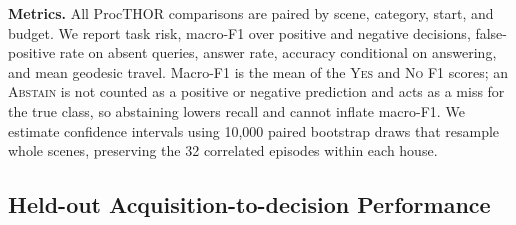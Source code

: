\documentclass[letterpaper, 10 pt, conference]{ieeeconf}
\newcommand{\method}{SafeVantage}
\begin{document}
  
    \textbf{Metrics.}
    All ProcTHOR comparisons are paired by scene, category, start, and budget. We report task risk, macro-F1 over positive and negative decisions, false-positive rate on absent queries, answer rate, accuracy conditional on answering, and mean geodesic travel. Macro-F1 is the mean of the \textsc{Yes} and \textsc{No} F1 scores; an \textsc{Abstain} is not counted as a positive or negative prediction and acts as a miss for the true class, so abstaining lowers recall and cannot inflate macro-F1. We estimate confidence intervals using 10,000 paired bootstrap draws that resample whole scenes, preserving the 32 correlated episodes within each house.
    
    
    
    
    \subsection{Held-out Acquisition-to-decision Performance}
    
\end{document}
